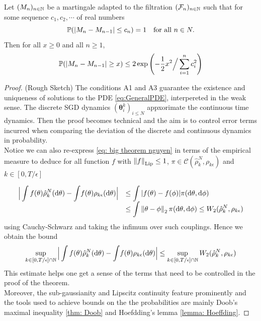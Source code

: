 \documentclass{article}
\begin{document}
\begin{boxlemma}\label{lemma: Hoeffding}
Let $ (M_{n})_{n\in\mathbb{N}}$ be a martingale adapted to the filtration $ (\mathcal{F}_{n})_{n\in\mathbb{N}}$ such that for some sequence $ c_{1}, c_{2},\cdots$ of real numbers 
\begin{equation}
	\mathbb{P}(|M_{n}-M_{n-1}|\leq c_{n}) = 1 \quad \text{for all } n\in N.
\end{equation}
Then for all $ x\geq 0$ and all $ n\geq 1$,
\begin{equation}
    \mathbb{P}(|M_{n}-M_{n-1}|\geq x)\leq 2 \exp \left( -\frac{1}{2}x^{2}\Big/\displaystyle\sum^{n}_{i=1}c_{i}^{2}  \right)
\end{equation}


\end{boxlemma}


\begin{proof}{(Rough Sketch)}
	The conditions {\sf A1} and {\sf A3} guarantee the existence and uniqueness of solutions to the PDE \ref{eq:GeneralPDE}, interpereted in the weak sense. The discrete SGD dynamics $ (\mathbf{\theta}_{i}^{k})_{i\leq N }$ appxorimate the continuous time dynamics. Then the proof becomes technical and the aim is to control error terms incurred when comparing the deviation of the discrete and continuous dynamics in probability.\\ 

    Notice we can also re-express \ref{eq: big theorem nguyen} in terms of the empirical measure to deduce for all function $ f$ with $ \left\lVert f\right\rVert_{\text{Lip}}\leq 1$, $ \pi \in \mathcal{C}(\hat{\rho}^{N}_{k}, \rho_{k\epsilon})$ and $ k\in [0,T/\epsilon]$

\begin{equation}
	\begin{array}{ll}
	\Big|\displaystyle\int f(\theta)\hat{\rho}^{N}_{k}(\operatorname{d}\! \theta)- \int\!
	f(\mathbf{\theta})  \rho_{k\epsilon}(\operatorname{d}\! \mathbf{\theta}) \Big| &\leq  \displaystyle\int |f(\theta)-f(\phi)|\pi(\operatorname{d}\! \theta, \operatorname{d}\! \phi)\\ 
									  &\leq \displaystyle\int \left\lVert\theta-\phi\right\rVert_{2}\pi(\operatorname{d}\! \theta, \operatorname{d}\! \phi)\leq W_{2}(\hat{\rho}^{N}_{k}, \rho_{k\epsilon}) 

\end{array}
\end{equation}
using Cauchy-Schwarz and taking the infimum over such couplings. Hence we obtain the bound 
\begin{equation}
    \sup_{k \in  [0, T/\epsilon] \cap \mathbb{N}}\Big|\displaystyle\int f(\theta)\hat{\rho}^{N}_{k}(\operatorname{d}\! \theta)- \int\!
	f(\mathbf{\theta})  \rho_{k\epsilon}(\operatorname{d}\! \mathbf{\theta}) \Big|\leq  \sup_{k \in  [0, T/\epsilon] \cap \mathbb{N}} W_{2}(\hat{\rho}^{N}_{k}, \rho_{k\epsilon}) 
\end{equation}
This estimate helps one get a sense of the terms that need to be controlled in the proof of the theorem.\\

	Moreover, the sub-gaussianity and Lipscitz continuity feature prominently and the tools used to achieve bounds on the the probabilities are mainly Doob's maximal inequality \ref{thm: Doob} and Hoefdding's lemma \ref{lemma: Hoeffding}. 
\end{proof}
\end{document}
